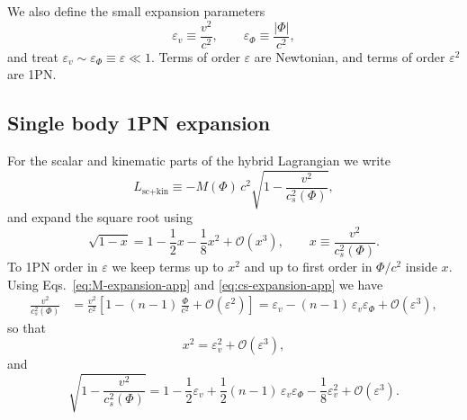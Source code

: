 \documentclass[11pt]{article}
\begin{document}
We also define the small expansion parameters
\begin{equation}
  \varepsilon_v \equiv \frac{v^2}{c^2},
  \qquad
  \varepsilon_\Phi \equiv \frac{|\Phi|}{c^2},
\end{equation}
and treat \(\varepsilon_v \sim \varepsilon_\Phi \equiv \varepsilon \ll 1\).
Terms of order \(\varepsilon\) are Newtonian, and terms of order
\(\varepsilon^2\) are 1PN.

\subsection{Single body 1PN expansion}
\label{app:1pn-single-body}

For the scalar and kinematic parts of the hybrid Lagrangian we write
\begin{equation}
  L_{\text{sc+kin}}
  \equiv -M(\Phi)\,c^2
          \sqrt{1 - \frac{v^2}{c_s^2(\Phi)}},
\end{equation}
and expand the square root using
\begin{equation}
  \sqrt{1 - x}
  = 1 - \frac{1}{2} x - \frac{1}{8} x^2
    + \mathcal{O}(x^3),
  \qquad x \equiv \frac{v^2}{c_s^2(\Phi)}.
\end{equation}
To 1PN order in \(\varepsilon\) we keep terms up to \(x^2\) and up to
first order in \(\Phi/c^2\) inside \(x\).  Using
Eqs.~\eqref{eq:M-expansion-app} and \eqref{eq:cs-expansion-app} we have
\begin{align}
  \frac{v^2}{c_s^2(\Phi)}
  &= \frac{v^2}{c^2}
     \left[
       1 - (n-1)\,\frac{\Phi}{c^2}
       + \mathcal{O}\!\left(\varepsilon^2\right)
     \right]
   = \varepsilon_v
     - (n-1)\,\varepsilon_v \varepsilon_\Phi
     + \mathcal{O}\!\left(\varepsilon^3\right),
\end{align}
so that
\begin{equation}
  x^2
  = \varepsilon_v^2
    + \mathcal{O}\!\left(\varepsilon^3\right),
\end{equation}
and
\begin{equation}
  \sqrt{1 - \frac{v^2}{c_s^2(\Phi)}}
  = 1 - \frac{1}{2} \varepsilon_v
    + \frac{1}{2}(n-1)\,\varepsilon_v \varepsilon_\Phi
    - \frac{1}{8} \varepsilon_v^2
    + \mathcal{O}\!\left(\varepsilon^3\right).
  \label{eq:sqrt-expanded-app}
\end{equation}
\end{document}

